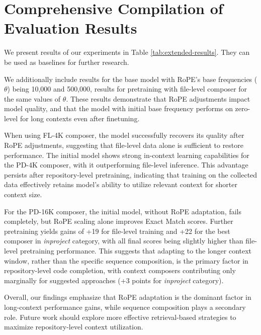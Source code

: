 \section{Comprehensive Compilation of Evaluation Results}

We present results of our experiments in Table \ref{tab:extended-results}. They can be used as baselines for further research.

We additionally include results for the base model with RoPE's base frequencies ($\theta$) being 10,000 and 500,000, results for pretraining with file-level composer for the same values of $\theta$. These results demonstrate that RoPE adjustments impact model quality, and that the model with initial base frequency performs on zero-level for long contexts even after finetuning.







When using FL-4K composer, the model successfully recovers its quality after RoPE adjustments, suggesting that file-level data alone is sufficient to restore performance. The initial model shows strong in-context learning capabilities for the PD-4K composer, with it outperforming file-level inference. This advantage persists after repository-level pretraining, indicating that training on the collected data effectively retains model's ability to utilize relevant context for shorter context size.

For the PD-16K composer, the initial model, without RoPE adaptation, fails completely, but RoPE scaling alone improves Exact Match scores. Further pretraining yields gains of +19 for file-level training and +22 for the best composer in \textit{inproject} category, with all final scores being slightly higher than file-level pretraining performance. This suggests that adapting to the longer context window, rather than the specific sequence composition, is the primary factor in repository-level code completion, with context composers contributing only marginally for suggested approaches (+3 points for \textit{inproject} category).


Overall, our findings emphasize that RoPE adaptation is the dominant factor in long-context performance gains, while sequence composition plays a secondary role. Future work should explore more effective retrieval-based strategies to maximize repository-level context utilization.



